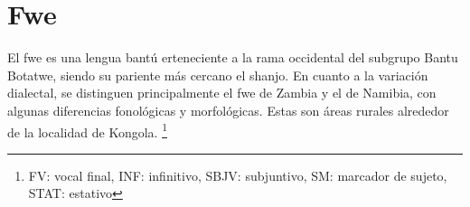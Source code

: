 \section*{Fwe}

\noindent El fwe es una lengua bantú erteneciente a la rama occidental del subgrupo Bantu Botatwe, siendo su pariente más cercano el shanjo. En cuanto a la variación dialectal, se distinguen principalmente el fwe de Zambia y el de Namibia, con algunas diferencias fonológicas y morfológicas. Estas son áreas rurales alrededor de la localidad de Kongola.
\footnote{FV: vocal final, INF: infinitivo, SBJV: subjuntivo, SM: marcador de sujeto, STAT: estativo}
\vspace{0.5cm}


